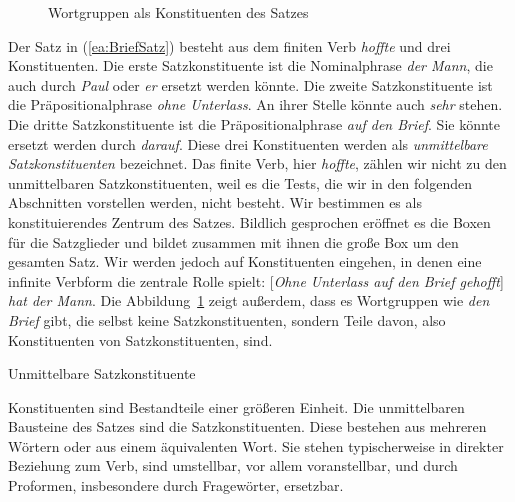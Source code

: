 \begin{figure}
    \centering
\caption{\label{fig:SatzkonstituentenSchacheltn1}Wortgruppen als Konstituenten des Satzes}
\end{figure}%

Der Satz in (\ref{ea:BriefSatz}) besteht aus dem finiten Verb \textit{hoffte} und drei Konstituenten. Die erste Satzkonstituente ist die Nominalphrase \textit{der Mann}, die auch durch \textit{Paul} oder \textit{er} ersetzt werden könnte. Die zweite Satzkonstituente ist die Präpositionalphrase \textit{ohne Unterlass}. An ihrer Stelle könnte auch \textit{sehr} stehen. Die dritte Satzkonstituente ist die Präpositionalphrase \textit{auf den Brief}. Sie könnte ersetzt werden durch \textit{darauf}. Diese drei Konstituenten werden als \textit{unmittelbare Satzkonstituenten} bezeichnet. Das finite Verb, hier \textit{hoffte}, zählen wir nicht zu den unmittelbaren Satzkonstituenten, weil es die Tests, die wir in den folgenden Abschnitten vorstellen werden, nicht besteht. Wir bestimmen es als konstituierendes Zentrum des Satzes. Bildlich gesprochen eröffnet es die Boxen für die Satzglieder und bildet zusammen mit ihnen die große Box um den gesamten Satz. Wir werden jedoch auf Konstituenten eingehen, in denen eine infinite Verbform die zentrale Rolle spielt: [\textit{Ohne Unterlass auf den Brief gehofft}] \textit{hat der Mann}. Die Abbildung~\ref{fig:SatzkonstituentenSchacheltn1} zeigt außerdem, dass es Wortgruppen wie \textit{den Brief} gibt, die selbst keine Satzkonstituenten, sondern Teile davon, also Konstituenten von Satzkonstituenten, sind. 
 

\begin{Definition}{Unmittelbare Satzkonstituente}\label{def:Unmittelbare Satzkonstiutente}
    
\noindent Konstituenten sind Bestandteile einer größeren Einheit. Die unmittelbaren Bausteine des Satzes sind die Satzkonstituenten. Diese bestehen aus mehreren Wörtern oder aus einem äquivalenten Wort. Sie stehen typischerweise in direkter Beziehung zum Verb, sind umstellbar, vor allem voranstellbar, und durch Proformen, insbesondere durch Fragewörter, ersetzbar.  
\end{Definition}


